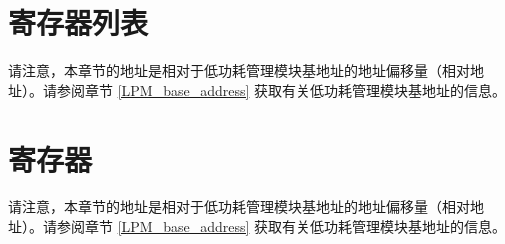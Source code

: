 \documentclass[main\_\_CN.tex]{subfiles}
\begin{document}
\hypertarget{lowpowm-reg-summ}{}
\section{寄存器列表}

请注意，本章节的地址是相对于低功耗管理模块基地址的地址偏移量（相对地址）。请参阅章节 \ref{LPM_base_address} 获取有关低功耗管理模块基地址的信息。


\newpage
\section{寄存器}\label{RTC_Register}
请注意，本章节的地址是相对于低功耗管理模块基地址的地址偏移量（相对地址）。请参阅章节 \ref{LPM_base_address} 获取有关低功耗管理模块基地址的信息。

\end{document}
